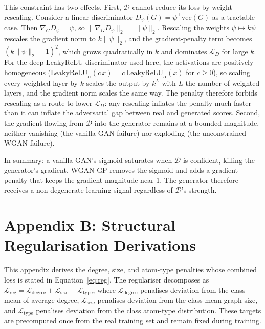 \documentclass[12pt,a4paper]{article}
\begin{document}
This constraint has two effects. First, $\mathcal{D}$ cannot reduce its loss by weight rescaling. Consider a linear discriminator $D_\psi(G) = \psi^\top \mathrm{vec}(G)$ as a tractable case. Then $\nabla_G D_\psi = \psi$, so $\|\nabla_G D_\psi\|_2 = \|\psi\|_2$. Rescaling the weights $\psi \mapsto k\psi$ rescales the gradient norm to $k\|\psi\|_2$, and the gradient-penalty term becomes $(k\|\psi\|_2 - 1)^2$, which grows quadratically in $k$ and dominates $\mathcal{L}_D$ for large $k$. For the deep LeakyReLU discriminator used here, the activations are positively homogeneous ($\text{LeakyReLU}_\alpha(c\,x) = c\,\text{LeakyReLU}_\alpha(x)$ for $c \geq 0$), so scaling every weighted layer by $k$ scales the output by $k^L$ with $L$ the number of weighted layers, and the gradient norm scales the same way. The penalty therefore forbids rescaling as a route to lower $\mathcal{L}_D$: any rescaling inflates the penalty much faster than it can inflate the adversarial gap between real and generated scores. Second, the gradient flowing from $\mathcal{D}$ into the generator remains at a bounded magnitude, neither vanishing (the vanilla GAN failure) nor exploding (the unconstrained WGAN failure).

In summary: a vanilla GAN's sigmoid saturates when $\mathcal{D}$ is confident, killing the generator's gradient. WGAN-GP removes the sigmoid and adds a gradient penalty that keeps the gradient magnitude near 1. The generator therefore receives a non-degenerate learning signal regardless of $\mathcal{D}$'s strength.

\label{app:reg}
\section*{Appendix B: Structural Regularisation Derivations}

This appendix derives the degree, size, and atom-type penalties whose combined loss is stated in Equation~\eqref{eq:reg}. The regulariser decomposes as $\mathcal{L}_{\text{reg}} = \mathcal{L}_{\text{degree}} + \mathcal{L}_{\text{size}} + \mathcal{L}_{\text{type}}$, where $\mathcal{L}_{\text{degree}}$ penalises deviation from the class mean of average degree, $\mathcal{L}_{\text{size}}$ penalises deviation from the class mean graph size, and $\mathcal{L}_{\text{type}}$ penalises deviation from the class atom-type distribution. These targets are precomputed once from the real training set and remain fixed during training.
\end{document}
